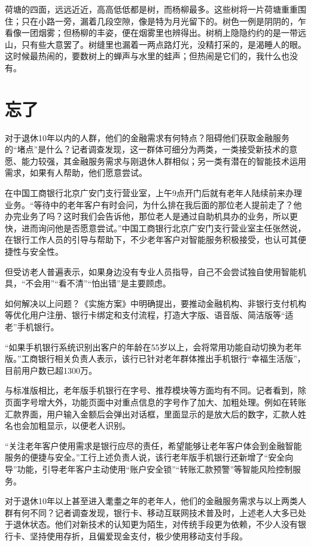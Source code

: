 \documentclass[printMode]{ecnuthesis}
\begin{document}
荷塘的四面，远远近近，高高低低都是树，而杨柳最多。这些树将一片荷塘重重围住；只在小路一旁，漏着几段空隙，像是特为月光留下的。树色一例是阴阴的，乍看像一团烟雾；但杨柳的丰姿，便在烟雾里也辨得出。树梢上隐隐约约的是一带远山，只有些大意罢了。树缝里也漏着一两点路灯光，没精打采的，是渴睡人的眼。这时候最热闹的，要数树上的蝉声与水里的蛙声；但热闹是它们的，我什么也没有。

\chapter{忘了}

对于退休10年以内的人群，他们的金融需求有何特点？阻碍他们获取金融服务的“堵点”是什么？记者调查发现，这一群体可细分为两类，一类接受新技术的意愿、能力较强，其金融服务需求与刚退休人群相似；另一类有潜在的智能技术运用需求，如果有人帮助，他们愿意尝试。

在中国工商银行北京广安门支行营业室，上午9点开门后就有老年人陆续前来办理业务。“等待中的老年客户有时会问，为什么排在我后面的那位老人提前走了？他办完业务了吗？这时我们会告诉他，那位老人是通过自助机具办的业务，所以更快，进而询问他是否愿意尝试。”中国工商银行北京广安门支行营业室主任张然说，在银行工作人员的引导与帮助下，不少老年客户对智能服务积极接受，也认可其便捷性与安全性。

但受访老人普遍表示，如果身边没有专业人员指导，自己不会尝试独自使用智能机具，“不会用”“看不清”“怕出错”是主要顾虑。

如何解决以上问题？《实施方案》中明确提出，要推动金融机构、非银行支付机构等优化用户注册、银行卡绑定和支付流程，打造大字版、语音版、简洁版等“适老”手机银行。

“如果手机银行系统识别出客户的年龄在55岁以上，会将常用功能自动切换为老年版。”工商银行相关负责人表示，该行已针对老年群体推出手机银行“幸福生活版”，目前用户数已超1300万。

与标准版相比，老年版手机银行在字号、推荐模块等方面均有不同。记者看到，除页面字号增大外，功能页面中对重点信息的字号作了加大、加粗处理。例如在转账汇款界面，用户输入金额后会弹出对话框，里面显示的是放大后的数字，汇款人姓名也会加粗显示，以便老人识别。

“关注老年客户使用需求是银行应尽的责任，希望能够让老年客户体会到金融智能服务的便捷与安全。”工行上述负责人说，该行老年版手机银行还新增了“安全向导”功能，引导老年客户主动使用“账户安全锁”“转账汇款预警”等智能风险控制服务。

对于退休10年以上甚至进入耄耋之年的老年人，他们的金融服务需求与以上两类人群有何不同？记者调查发现，银行卡、移动互联网技术普及时，上述老人大多已处于退休状态。他们对新技术的认知更为陌生，对传统手段更为依赖，不少人没有银行卡、坚持使用存折，且偏爱现金支付，极少使用移动支付手段。
\end{document}
